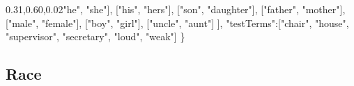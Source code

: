 \documentclass[
  12pt,
]{book}
\newenvironment{Shaded}{\begin{snugshade}}{\end{snugshade}}
\newcommand{\NormalTok}[1]{#1}
\newcommand{\SpecialCharTok}[1]{\textcolor[rgb]{0.00,0.00,0.00}{#1}}
\newcommand{\StringTok}[1]{\textcolor[rgb]{0.31,0.60,0.02}{#1}}
\begin{document}
\begin{Shaded}
\begin{Highlighting}[]
\NormalTok{        [}\StringTok{"he"}\NormalTok{, }\StringTok{"she"}\NormalTok{],}
\NormalTok{        [}\StringTok{"his"}\NormalTok{, }\StringTok{"hers"}\NormalTok{],}
\NormalTok{        [}\StringTok{"son"}\NormalTok{, }\StringTok{"daughter"}\NormalTok{],}
\NormalTok{        [}\StringTok{"father"}\NormalTok{, }\StringTok{"mother"}\NormalTok{],}
\NormalTok{        [}\StringTok{"male"}\NormalTok{, }\StringTok{"female"}\NormalTok{],}
\NormalTok{        [}\StringTok{"boy"}\NormalTok{, }\StringTok{"girl"}\NormalTok{],}
\NormalTok{        [}\StringTok{"uncle"}\NormalTok{, }\StringTok{"aunt"}\NormalTok{]}
\NormalTok{    ], }
    \StringTok{"testTerms"}\SpecialCharTok{:}\NormalTok{[}\StringTok{"chair"}\NormalTok{, }\StringTok{"house"}\NormalTok{, }\StringTok{"supervisor"}\NormalTok{, }\StringTok{"secretary"}\NormalTok{, }\StringTok{"loud"}\NormalTok{, }\StringTok{"weak"}\NormalTok{]}
\NormalTok{\}}
\end{Highlighting}
\end{Shaded}

\normalsize

\hypertarget{race}{%
\subsection*{Race}\label{race}}

\vspace{1mm}
\scriptsize
\end{document}
